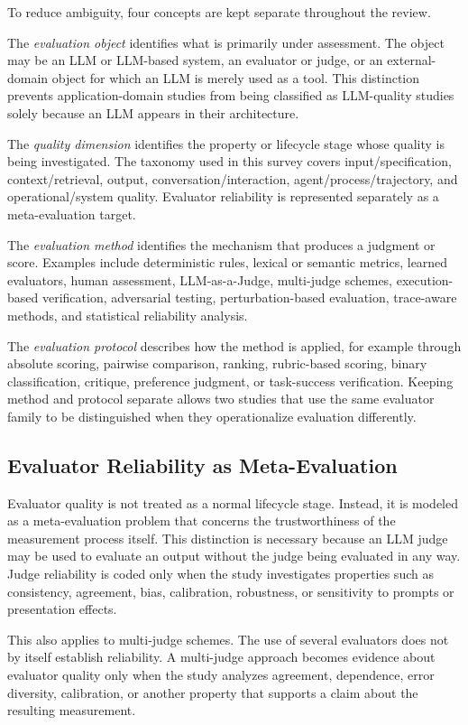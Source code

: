 To reduce ambiguity, four concepts are kept separate throughout the review.

The \emph{evaluation object} identifies what is primarily under assessment. The object may be an LLM or LLM-based system, an evaluator or judge, or an external-domain object for which an LLM is merely used as a tool. This distinction prevents application-domain studies from being classified as LLM-quality studies solely because an LLM appears in their architecture.

The \emph{quality dimension} identifies the property or lifecycle stage whose quality is being investigated. The taxonomy used in this survey covers input/specification, context/retrieval, output, conversation/interaction, agent/process/trajectory, and operational/system quality. Evaluator reliability is represented separately as a meta-evaluation target.

The \emph{evaluation method} identifies the mechanism that produces a judgment or score. Examples include deterministic rules, lexical or semantic metrics, learned evaluators, human assessment, LLM-as-a-Judge, multi-judge schemes, execution-based verification, adversarial testing, perturbation-based evaluation, trace-aware methods, and statistical reliability analysis.

The \emph{evaluation protocol} describes how the method is applied, for example through absolute scoring, pairwise comparison, ranking, rubric-based scoring, binary classification, critique, preference judgment, or task-success verification. Keeping method and protocol separate allows two studies that use the same evaluator family to be distinguished when they operationalize evaluation differently.

\subsection{Evaluator Reliability as Meta-Evaluation}

Evaluator quality is not treated as a normal lifecycle stage. Instead, it is modeled as a meta-evaluation problem that concerns the trustworthiness of the measurement process itself. This distinction is necessary because an LLM judge may be used to evaluate an output without the judge being evaluated in any way. Judge reliability is coded only when the study investigates properties such as consistency, agreement, bias, calibration, robustness, or sensitivity to prompts or presentation effects.

This also applies to multi-judge schemes. The use of several evaluators does not by itself establish reliability. A multi-judge approach becomes evidence about evaluator quality only when the study analyzes agreement, dependence, error diversity, calibration, or another property that supports a claim about the resulting measurement.

